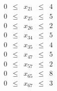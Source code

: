 \documentclass[a4paper]{scrartcl}
\begin{document}
\begin{enumerate}[label=\bfseries\arabic*.]
\begin{enumerate}
\begin{equation}
\begin{gathered}
\begin{array}{rcrcr}
                            0 & \leq & x_{21} & \leq & 4 \\
                            0 & \leq & x_{25} & \leq & 5 \\
                            0 & \leq & x_{26} & \leq & 2 \\
                            0 & \leq & x_{34} & \leq & 5 \\
                            0 & \leq & x_{35} & \leq & 4 \\
                            0 & \leq & x_{47} & \leq & 5 \\
                            0 & \leq & x_{57} & \leq & 2 \\
                            0 & \leq & x_{65} & \leq & 8 \\
                            0 & \leq & x_{67} & \leq & 3
                        \end{array}
                    \end{gathered}
                \end{equation}


\end{enumerate}
\end{enumerate}
\end{document}
